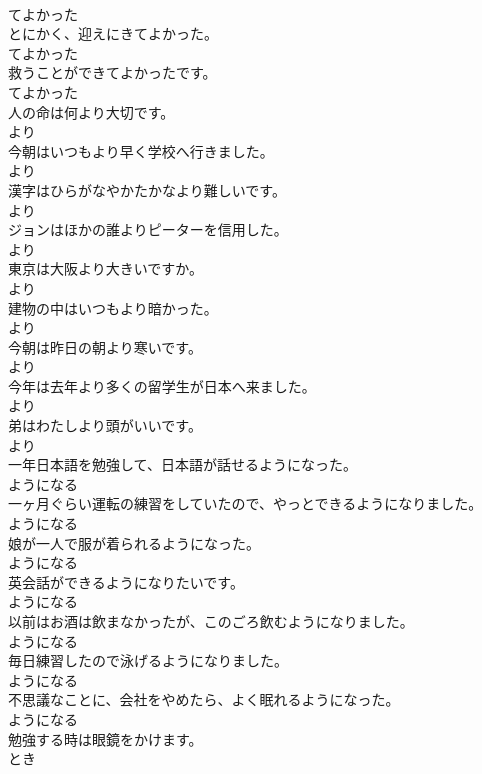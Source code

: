 \documentclass[8pt]{extreport}
\begin{document}
\begin{CJK}{UTF8}{min}
\\	てよかった	
\\	とにかく、迎えにきてよかった。	
\\	てよかった	
\\	救うことができてよかったです。	
\\	てよかった	
\\	人の命は何より大切です。	
\\	より	
\\	今朝はいつもより早く学校へ行きました。	
\\	より	
\\	漢字はひらがなやかたかなより難しいです。	
\\	より	
\\	ジョンはほかの誰よりピーターを信用した。	
\\	より	
\\	東京は大阪より大きいですか。	
\\	より	
\\	建物の中はいつもより暗かった。	
\\	より	
\\	今朝は昨日の朝より寒いです。	
\\	より	
\\	今年は去年より多くの留学生が日本へ来ました。	
\\	より	
\\	弟はわたしより頭がいいです。	
\\	より	
\\	一年日本語を勉強して、日本語が話せるようになった。	
\\	ようになる	
\\	一ヶ月ぐらい運転の練習をしていたので、やっとできるようになりました。	
\\	ようになる	
\\	娘が一人で服が着られるようになった。	
\\	ようになる	
\\	英会話ができるようになりたいです。	
\\	ようになる	
\\	以前はお酒は飲まなかったが、このごろ飲むようになりました。	
\\	ようになる	
\\	毎日練習したので泳げるようになりました。	
\\	ようになる	
\\	不思議なことに、会社をやめたら、よく眠れるようになった。	
\\	ようになる	
\\	勉強する時は眼鏡をかけます。	
\\	とき	

\end{CJK}
\end{document}
